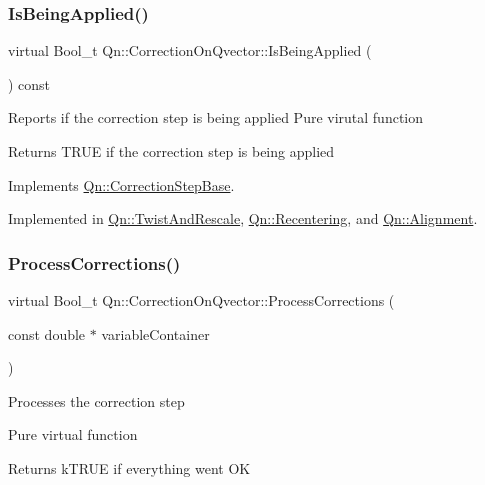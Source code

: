 \subsubsection{\texorpdfstring{Is\+Being\+Applied()}{IsBeingApplied()}}
{\footnotesize\ttfamily virtual Bool\+\_\+t Qn\+::\+Correction\+On\+Qvector\+::\+Is\+Being\+Applied (\begin{DoxyParamCaption}{ }\end{DoxyParamCaption}) const\hspace{0.3cm}{\ttfamily [pure virtual]}}

Reports if the correction step is being applied Pure virutal function \begin{DoxyReturn}{Returns}
T\+R\+UE if the correction step is being applied 
\end{DoxyReturn}


Implements \mbox{\hyperlink{classQn_1_1CorrectionStepBase_aa99ab21886c2b4d8c3c6e1f60b84acc9}{Qn\+::\+Correction\+Step\+Base}}.



Implemented in \mbox{\hyperlink{classQn_1_1TwistAndRescale_a82b3138efce50ea788122dd26ca964d7}{Qn\+::\+Twist\+And\+Rescale}}, \mbox{\hyperlink{classQn_1_1Recentering_a3849efa27b2827a2f307a100bc046916}{Qn\+::\+Recentering}}, and \mbox{\hyperlink{classQn_1_1Alignment_aaa38151d72ebf1aa97247ba07c4d16e5}{Qn\+::\+Alignment}}.

\mbox{\label{classQn_1_1CorrectionOnQvector_a2c2d7f0e48471fb9269f0b5f9aa3e836}} 
\subsubsection{\texorpdfstring{Process\+Corrections()}{ProcessCorrections()}}
{\footnotesize\ttfamily virtual Bool\+\_\+t Qn\+::\+Correction\+On\+Qvector\+::\+Process\+Corrections (\begin{DoxyParamCaption}\item[{const double $\ast$}]{variable\+Container }\end{DoxyParamCaption})\hspace{0.3cm}{\ttfamily [pure virtual]}}

Processes the correction step

Pure virtual function \begin{DoxyReturn}{Returns}
k\+T\+R\+UE if everything went OK 
\end{DoxyReturn}


